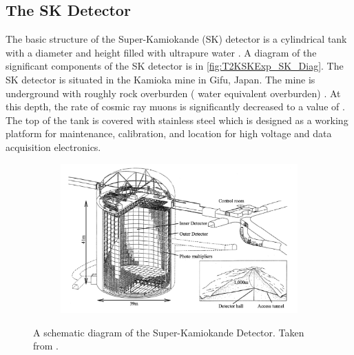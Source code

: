 \subsection{The SK Detector}
\label{subsec:T2KSKExp_SKDetector}

The basic structure of the Super-Kamiokande (SK) detector is a cylindrical tank with a diameter  and height  filled with ultrapure water \cite{Abe_2014_SKCalib}. A diagram of the significant components of the SK detector is   in \autoref{fig:T2KSKExp_SK_Diag}. The SK detector is situated in the Kamioka mine in Gifu, Japan. The mine is underground with roughly  rock overburden ( water equivalent overburden) \cite{Fukuda2003-ly}. At this depth, the rate of cosmic ray muons is significantly decreased to a value of . The top of the tank is covered with stainless steel which is designed as a working platform for maintenance, calibration, and location for high voltage and data acquisition electronics.

\begin{figure}[h]
  \begin{subfigure}[t]{0.95\textwidth}
    \includegraphics[width=\textwidth, trim={0mm 0mm 0mm 0mm}, clip,page=1]{Figures/Detectors/SKDiagram.pdf}
  \end{subfigure}
  \caption{A schematic diagram of the Super-Kamiokande Detector. Taken from \cite{Itow2001-bc}.}
  \label{fig:T2KSKExp_SK_Diag}
\end{figure}


